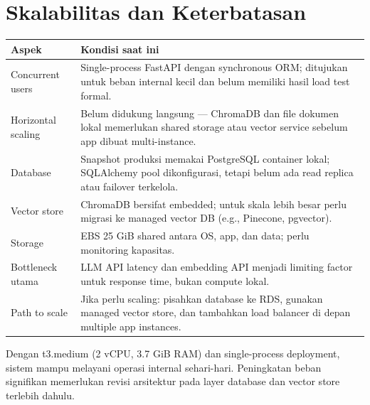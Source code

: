 \documentclass[11pt,a4paper]{article}
\begin{document}
\section{Skalabilitas dan Keterbatasan}
\begin{tabularx}{\linewidth}{@{}p{4.5cm}X@{}}
\toprule \textbf{Aspek} & \textbf{Kondisi saat ini} \\ \midrule
Concurrent users & Single-process FastAPI dengan synchronous ORM; ditujukan untuk beban internal kecil dan belum memiliki hasil load test formal. \\
Horizontal scaling & Belum didukung langsung --- ChromaDB dan file dokumen lokal memerlukan shared storage atau vector service sebelum app dibuat multi-instance. \\
Database & Snapshot produksi memakai PostgreSQL container lokal; SQLAlchemy pool dikonfigurasi, tetapi belum ada read replica atau failover terkelola. \\
Vector store & ChromaDB bersifat embedded; untuk skala lebih besar perlu migrasi ke managed vector DB (e.g., Pinecone, pgvector). \\
Storage & EBS 25 GiB shared antara OS, app, dan data; perlu monitoring kapasitas. \\
Bottleneck utama & LLM API latency dan embedding API menjadi limiting factor untuk response time, bukan compute lokal. \\
Path to scale & Jika perlu scaling: pisahkan database ke RDS, gunakan managed vector store, dan tambahkan load balancer di depan multiple app instances. \\
\bottomrule
\end{tabularx}

\begin{infobox}
Dengan t3.medium (2 vCPU, 3.7 GiB RAM) dan single-process deployment, sistem mampu melayani operasi internal sehari-hari. Peningkatan beban signifikan memerlukan revisi arsitektur pada layer database dan vector store terlebih dahulu.
\end{infobox}

\newpage
\end{document}
